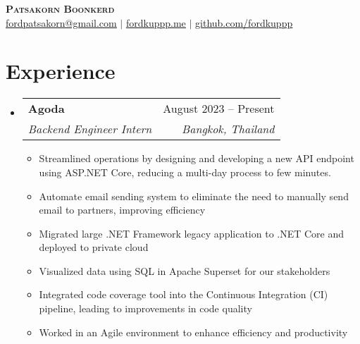 \documentclass[letterpaper,11pt]{article}
\makeatletter
\newcommand{\resumeItem}[1]{
  \item\small{
    {#1 \vspace{-2pt}}
  }
}
\newcommand{\resumeSubheading}[4]{
  \vspace{-2pt}\item
    \begin{tabular*}{0.97\textwidth}[t]{l@{\extracolsep{\fill}}r}
      \textbf{#1} & #2 \\
      \textit{\small#3} & \textit{\small #4} \\
    \end{tabular*}\vspace{-7pt}
}
\newcommand{\resumeSubHeadingListStart}{\begin{itemize}[leftmargin=0.15in, label={}]}
\newcommand{\resumeSubHeadingListEnd}{\end{itemize}}
\newcommand{\resumeItemListStart}{\begin{itemize}}
\newcommand{\resumeItemListEnd}{\end{itemize}\vspace{-5pt}}
\makeatother
\begin{document}

\begin{center}
    \textbf{\Huge \scshape Patsakorn Boonkerd} \\ \vspace{1pt}
    \footnotesize{
       \href{mailto:fordpatsakorn@gmail.com}{\underline{fordpatsakorn@gmail.com}} $|$ 
       \href{https://fordkuppp.me/}{\underline{fordkuppp.me}} $|$ 
       \href{https://github.com/fordkuppp}{\underline{github.com/fordkuppp}}
    }
\end{center}


\section{Experience}
  \resumeSubHeadingListStart
    \resumeSubheading
      {Agoda}{August 2023 -- Present}
      {Backend Engineer Intern}{Bangkok, Thailand}
      \resumeItemListStart
        \resumeItem{Streamlined operations by designing and developing a new API endpoint using ASP.NET Core, reducing a multi-day process to few minutes.}
        \resumeItem{Automate email sending system to eliminate the need to manually send email to partners, improving efficiency}
        \resumeItem{Migrated large .NET Framework legacy application to .NET Core and deployed to private cloud}
        \resumeItem{Visualized data using SQL in Apache Superset for our stakeholders}
        \resumeItem{Integrated code coverage tool into the Continuous Integration (CI) pipeline, leading to improvements in code quality}
        \resumeItem{Worked in an Agile environment to enhance efficiency and productivity}

      \resumeItemListEnd
  \resumeSubHeadingListEnd

\end{document}
